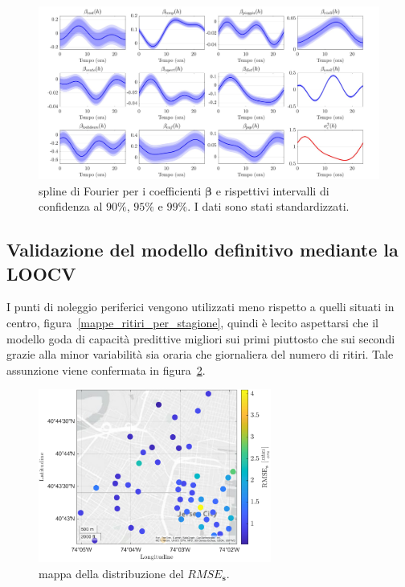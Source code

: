 \begin{figure}[htpb]
	\centering
	\includegraphics[height=215px]{Immagini/4. Caso di studio/Model selection/Trend spline, rho=100m}
	\caption[Spline di Fourier per i coefficienti $\boldsymbol{\beta}$ e rispettivi intervalli di confidenza]{spline di Fourier per i coefficienti $\boldsymbol{\beta}$ e rispettivi intervalli di confidenza al $90\%$, $95\%$ e $99\%$. I dati sono stati standardizzati.}
	\label{trend_beta}
\end{figure}

\subsection{Validazione del modello definitivo mediante la LOOCV}
I punti di noleggio periferici vengono utilizzati meno rispetto a quelli situati in centro, figura~\ref{mappe_ritiri_per_stagione}, quindi è lecito aspettarsi che il modello goda di capacità predittive migliori sui primi piuttosto che sui secondi grazie alla minor variabilità sia oraria che giornaliera del numero di ritiri. Tale assunzione viene confermata in figura~\ref{mappa_RMSE_s}.

\begin{figure}[htpb]
	\centering
	\includegraphics[height=215px]{Immagini/4. Caso di studio/LOOCV/RMSE_s}
	\caption[Mappa della distribuzione del $RMSE_\mathbf{s}$]{mappa della distribuzione del $RMSE_\mathbf{s}$.}
	\label{mappa_RMSE_s}
\end{figure}

